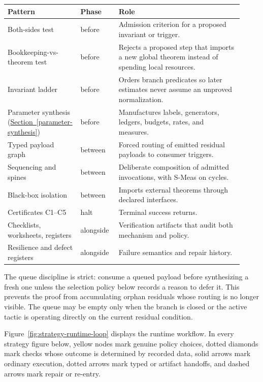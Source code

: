 \documentclass[
  11pt,
]{article}
\theoremstyle{definition}
\newcommand{\secref}[1]{\hyperref[#1]{Section~\ref*{#1}}}
\begin{document}
\begingroup
\small
\setlength{\tabcolsep}{2pt}
\begin{longtable}[]{@{}
  >{\raggedright\arraybackslash}p{0.24\linewidth}
  >{\raggedright\arraybackslash}p{0.16\linewidth}
  >{\raggedright\arraybackslash}p{0.52\linewidth}@{}}
\toprule\noalign{}
Pattern & Phase & Role \\
\midrule\noalign{}
\endhead
\bottomrule\noalign{}
\endlastfoot
Both-sides test & before & Admission criterion for a proposed invariant or trigger. \\
Bookkeeping-vs-theorem test & before & Rejects a proposed step that imports a new global theorem instead of spending local resources. \\
Invariant ladder & before & Orders branch predicates so later estimates never assume an unproved normalization. \\
Parameter synthesis (\secref{parameter-synthesis}) & before & Manufactures labels, generators, ledgers, budgets, rates, and measures. \\
Typed payload graph & between & Forced routing of emitted residual payloads to consumer triggers. \\
Sequencing and spines & between & Deliberate composition of admitted invocations, with S-Meas on cycles. \\
Black-box isolation & between & Imports external theorems through declared interfaces. \\
Certificates C1--C5 & halt & Terminal success returns. \\
Checklists, worksheets, registers & alongside & Verification artifacts that audit both mechanism and policy. \\
Resilience and defect registers & alongside & Failure semantics and repair history. \\
\end{longtable}
\endgroup

The queue discipline is strict: consume a queued payload before
synthesizing a fresh one unless the selection policy below records a
reason to defer it. This prevents the proof from accumulating orphan
residuals whose routing is no longer visible.  The queue may be empty
only when the branch is closed or the active tactic is operating
directly on the current residual condition.

Figure~\ref{fig:strategy-runtime-loop} displays the runtime workflow.
In every strategy figure below, yellow nodes mark genuine policy choices,
dotted diamonds mark checks whose outcome is determined by recorded data,
solid arrows mark ordinary execution, dotted arrows mark typed or artifact
handoffs, and dashed arrows mark repair or re-entry.
\end{document}
